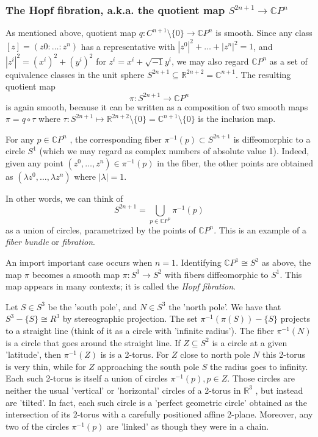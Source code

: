 \documentclass{article}
\theoremstyle{definition}
\begin{document}
\subsubsection{The Hopf fibration, a.k.a. the quotient map \texorpdfstring{$S^{2n+1} \rightarrow \mathbb C P^n$}{S2n+1 to CPn}}

As mentioned above, quotient map $q : C^{n+1} \setminus \{0\} \rightarrow \mathbb C P^n$ is smooth.  Since any class $[z] = (z 0 : \dots : z^n )$ has a representative with $|z^0|^2 + \dots +|z^n|^2 = 1$, and $|z^i|^2 = (x^i)^2 + (y^i)^2$ for $z^i = x^i + \sqrt{-1}y^i$, we may also regard $\mathbb C P^n$ as a set of equivalence classes in the unit sphere $S^{2n+1} \subseteq \mathbb R^{2n+2} = \mathbb C^{n+1}$. The resulting quotient map
\[
    \pi : S^{2n+1} \rightarrow \mathbb C P^n 
\]
is again smooth, because it can be written as a composition of two smooth maps $\pi = q \circ \tau$  where $\tau : S ^{2n+1} \mapsto \mathbb R^{2n+2} \setminus \{0\} = \mathbb C^{n+1} \setminus \{0\}$ is the inclusion map.

For any $p \in \mathbb C P^n$ , the corresponding fiber $\pi^{-1} (p) \subset S^{2n+1}$ is diffeomorphic to a circle $S^1$ (which we may regard as complex numbers of absolute value 1). Indeed, given any point $(z^0 , \dots ,z^n ) \in \pi^{-1} (p)$ in the fiber, the other points are obtained as $(\lambda z^0 ,\dots, \lambda z^n )$ where $|\lambda| = 1$.

In other words, we can think of
\[
    S^{2n+1} = \bigcup_{p \in \mathbb C P^n} \pi^{- 1}(p)
\]
as a union of circles, parametrized by the points of $\mathbb C P^n$. This is an example of a \textit{fiber bundle} or \textit{fibration}. 

An import important case occurs when $n = 1$. Identifying $\mathbb C P^1 \cong  S^2$ as above, the map $\pi$ becomes a smooth map $\pi : S^3 \rightarrow S^2$ with fibers diffeomorphic to $S^1$. This map appears in many contexts; it is called the
\textit{Hopf fibration}.

Let $S \in S^3$ be the 'south pole', and $N \in S^3$ the 'north pole'. We have that $S^3 - \{S\} \cong R^3$ by stereographic projection. The set $\pi^{-1} (\pi(S)) -  \{S\}$ projects to a straight line (think of it as a circle with 'infinite radius'). The fiber $\pi ^{-1} (N)$ is a circle that goes around the straight line. If $Z \subseteq S^2$ is a circle at a given 'latitude', then $\pi^{-1} (Z)$ is is a 2-torus. For $Z$ close to north pole $N$ this 2-torus is very thin, while for $Z$ approaching the south pole $S$ the radius goes to infinity. Each such 2-torus is itself a union of circles $\pi^{-1} (p), p \in Z$. Those circles are neither the usual 'vertical' or 'horizontal' circles of a 2-torus in $\mathbb R^3$ , but instead are 'tilted'. In fact, each such circle is a 'perfect geometric circle' obtained as the intersection of its 2-torus with a carefully positioned affine 2-plane. Moreover, any two of the circles $\pi^{-1} (p)$ are 'linked' as though they were in a chain.
\end{document}
